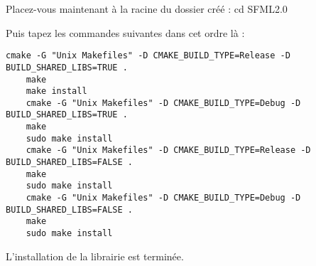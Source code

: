 Placez-vous maintenant à la racine du dossier créé : cd SFML2.0

Puis tapez les commandes suivantes dans cet ordre là :

\begin{lstlisting}[caption={Compilation de la SFML}]
	cmake -G "Unix Makefiles" -D CMAKE_BUILD_TYPE=Release -D BUILD_SHARED_LIBS=TRUE .
	make
	make install
	cmake -G "Unix Makefiles" -D CMAKE_BUILD_TYPE=Debug -D BUILD_SHARED_LIBS=TRUE .
	make
	sudo make install
	cmake -G "Unix Makefiles" -D CMAKE_BUILD_TYPE=Release -D BUILD_SHARED_LIBS=FALSE .
	make
	sudo make install
	cmake -G "Unix Makefiles" -D CMAKE_BUILD_TYPE=Debug -D BUILD_SHARED_LIBS=FALSE .
	make
	sudo make install
\end{lstlisting}	

L'installation de la librairie est terminée.


